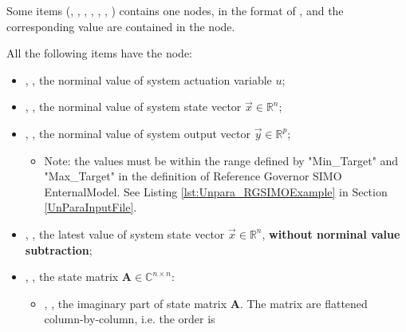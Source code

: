 Some items (, , , , , , 
) contains one  nodes, in the format of 
, and the corresponding value are contained in the  node. 

All the following items have the  node:
\begin{itemize}
  \item {}, , 
  the norminal value of system actuation variable \begin{math} u \end{math};
  \item {}, , 
  the norminal value of system state vector \begin{math} \overrightarrow{x}\in\mathbb{R}^n \end{math};
  \item {}, , 
  the norminal value of system output vector \begin{math} \overrightarrow{y}\in\mathbb{R}^p \end{math};
  \begin{itemize}
    \item Note: the  values must be within the range defined by "Min\_Target" and "Max\_Target" in the 
    definition of Reference Governor SIMO EnternalModel. See Listing \ref{lst:Unpara_RGSIMOExample} in Section 
    \ref{UnParaInputFile}.
  \end{itemize}
  \item {}, , 
  the latest value of system state vector \begin{math} \overrightarrow{x}\in\mathbb{R}^n \end{math}, 
  \textbf{without norminal value subtraction};

  \item {}, , 
  the state matrix \begin{math} \textbf{A}\in\mathbb{C}^{n \times n} \end{math}:
  \begin{itemize}
    \item {}, , 
    the imaginary part of state matrix \begin{math} \textbf{A} \end{math}. The matrix are flattened 
    column-by-column, i.e. the order is 


\end{itemize}
\end{itemize}
